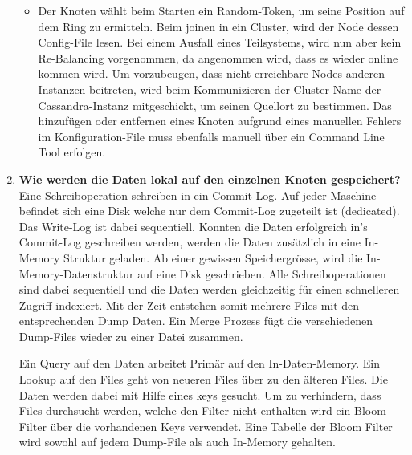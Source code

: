 \documentclass[a4paper,10pt,titlepage=false]{scrreprt}
\begin{document}
\begin{enumerate}
\begin{itemize}
\item Der Knoten wählt beim Starten ein Random-Token, um seine Position auf dem Ring zu ermitteln. Beim joinen in ein Cluster, wird der Node dessen Config-File lesen. Bei einem Ausfall eines Teilsystems, wird nun aber kein Re-Balancing vorgenommen, da angenommen wird, dass es wieder online kommen wird. Um vorzubeugen, dass nicht erreichbare Nodes anderen Instanzen beitreten, wird beim Kommunizieren der Cluster-Name der Cassandra-Instanz mitgeschickt, um seinen Quellort zu bestimmen. Das hinzufügen oder entfernen eines Knoten aufgrund eines manuellen Fehlers im Konfiguration-File muss ebenfalls manuell über ein Command Line Tool erfolgen.
\end{itemize}
\item \textbf{Wie werden die Daten lokal auf den einzelnen Knoten gespeichert?} Eine Schreiboperation schreiben in ein Commit-Log. Auf jeder Maschine befindet sich eine Disk welche nur dem Commit-Log zugeteilt ist (dedicated). Das Write-Log ist dabei sequentiell. Konnten die Daten erfolgreich in's Commit-Log geschreiben werden, werden die Daten zusätzlich in eine In-Memory Struktur geladen. Ab einer gewissen Speichergrösse, wird die In-Memory-Datenstruktur auf eine Disk geschrieben. Alle Schreiboperationen sind dabei sequentiell und die Daten werden gleichzeitig für einen schnelleren Zugriff indexiert. Mit der Zeit entstehen somit mehrere Files mit den entsprechenden Dump Daten. Ein Merge Prozess fügt die verschiedenen Dump-Files wieder zu einer Datei zusammen.

Ein Query auf den Daten arbeitet Primär auf den In-Daten-Memory. Ein Lookup auf den Files geht von neueren Files über zu den älteren Files. Die Daten werden dabei mit Hilfe eines keys gesucht. Um zu verhindern, dass Files durchsucht werden, welche den Filter nicht enthalten wird ein Bloom Filter über die vorhandenen Keys verwendet. Eine Tabelle der Bloom Filter wird sowohl auf jedem Dump-File als auch In-Memory gehalten.
\end{enumerate}
\end{document}
